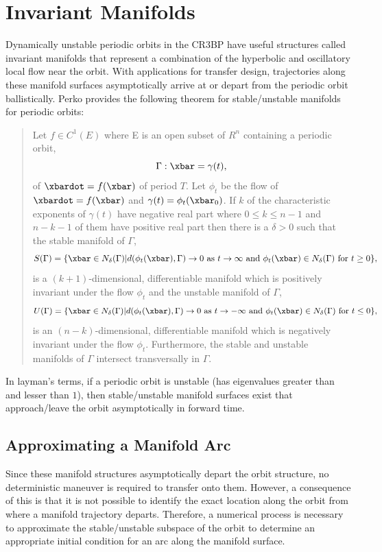 \section{Invariant Manifolds}
Dynamically unstable periodic orbits in the CR3BP have useful structures called invariant manifolds
that represent a combination of the hyperbolic and oscillatory local flow near the orbit. With
applications for transfer design, trajectories along these manifold surfaces asymptotically arrive
at or depart from the periodic orbit ballistically. Perko provides the following theorem for
stable/unstable manifolds for periodic orbits\cite{Perko:1991}:
\begin{quote}
    Let $f\in C^{1}(E)$ where E is an open subset of $R^{n}$ containing a periodic orbit,
    \begin{equation}
        \Gamma:\xbar=\gamma(t),
    \end{equation}
    of $\xbardot=f(\xbar)$ of period $T$. Let $\phi_{t}$ be the flow of $\xbardot=f(\xbar)$ and
    $\gamma(t)=\phi_{t}(\xbar_{0})$. If $k$ of the characteristic exponents of $\gamma(t)$ have
    negative real part where $0\leq k\leq n-1$ and $n-k-1$ of them have positive real part then
    there is a $\delta>0$ such that the stable manifold of $\Gamma$,
    \begin{equation}
        S(\Gamma)=\{\xbar\in N_{\delta}(\Gamma)|d(\phi_{t}(\xbar),\Gamma)\rightarrow0\text{ as }t\rightarrow\infty\text{ and }\phi_{t}(\xbar)\in N_{\delta}(\Gamma)\text{ for }t\geq0\},
    \end{equation}
    is a $(k+1)$-dimensional, differentiable manifold which is positively invariant under the flow
    $\phi_{t}$ and the unstable manifold of $\Gamma$,
    \begin{equation}
        U(\Gamma)=\{\xbar\in N_{\delta}(\Gamma)|d(\phi_{t}(\xbar),\Gamma)\rightarrow0\text{ as }t\rightarrow-\infty\text{ and }\phi_{t}(\xbar)\in N_{\delta}(\Gamma)\text{ for }t\leq0\},
    \end{equation}
    is an $(n-k)$-dimensional, differentiable manifold which is negatively invariant under the flow
    $\phi_{t}$. Furthermore, the stable and unstable manifolds of $\Gamma$ intersect transversally
    in $\Gamma$.
\end{quote}
In layman's terms, if a periodic orbit is unstable (has eigenvalues greater than and lesser than
$1$), then stable/unstable manifold surfaces exist that approach/leave the orbit asymptotically in
forward time.

\subsection{Approximating a Manifold Arc}
Since these manifold structures asymptotically depart the orbit structure, no deterministic
maneuver is required to transfer onto them. However, a consequence of this is that it is not
possible to identify the exact location along the orbit from where a manifold trajectory departs.
Therefore, a numerical process is necessary to approximate the stable/unstable subspace of the
orbit to determine an appropriate initial condition for an arc along the manifold surface.

